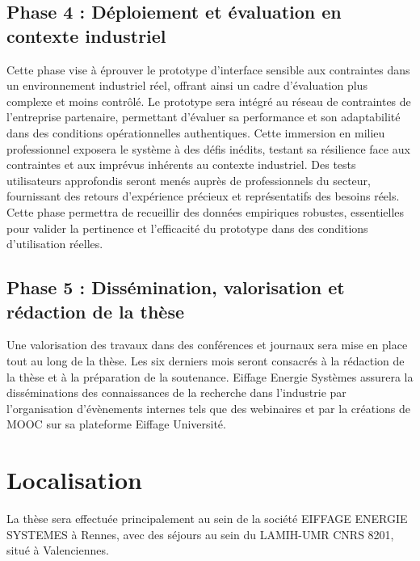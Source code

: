 \documentclass[a4paper,12pt]{article}
\begin{document}
\subsection{Phase 4 : Déploiement et évaluation en contexte industriel}
\label{sec:org387533b}
Cette phase vise à éprouver le prototype d'interface sensible aux contraintes dans un environnement industriel réel, offrant ainsi un cadre d'évaluation plus complexe et moins contrôlé.
Le prototype sera intégré au réseau de contraintes de l'entreprise partenaire, permettant d'évaluer sa performance et son adaptabilité dans des conditions opérationnelles authentiques. Cette immersion en milieu professionnel exposera le système à des défis inédits, testant sa résilience face aux contraintes et aux imprévus inhérents au contexte industriel. Des tests utilisateurs approfondis seront menés auprès de professionnels du secteur, fournissant des retours d'expérience précieux et représentatifs des besoins réels.
Cette phase permettra de recueillir des données empiriques robustes, essentielles pour valider la pertinence et l'efficacité du prototype dans des conditions d'utilisation réelles.
\subsection{Phase 5 : Dissémination, valorisation et rédaction de la thèse}
\label{sec:orgbe796f5}
Une valorisation des travaux dans des conférences et journaux sera mise en place tout au long de la thèse.
Les six derniers mois seront consacrés à la rédaction de la thèse et à la préparation de la soutenance.
Eiffage Energie Systèmes assurera la disséminations des connaissances de la recherche dans l'industrie par l'organisation d'évènements internes tels que des webinaires et par la créations de MOOC sur sa plateforme Eiffage Université.
\section{Localisation}
\label{sec:org071987d}
La thèse sera effectuée principalement au sein de la société EIFFAGE ENERGIE SYSTEMES à Rennes, avec des séjours au sein du LAMIH-UMR CNRS 8201, situé à Valenciennes. 
\end{document}
